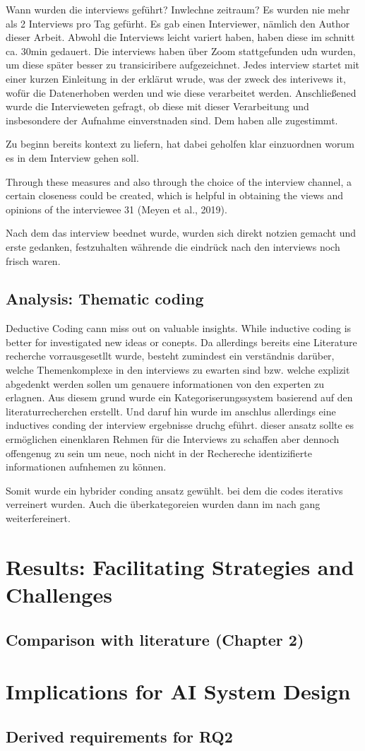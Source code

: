 Wann wurden die interviews geführt? Inwlechne zeitraum?
Es wurden nie mehr als 2 Interviews pro Tag gefürht. Es gab einen Interviewer, nämlich den Author dieser Arbeit.
Abwohl die Interviews leicht variert haben, haben diese im schnitt ca. 30min gedauert.
Die interviews haben über Zoom stattgefunden udn wurden, um diese später besser zu transiciribere aufgezeichnet.
Jedes interview startet mit einer kurzen Einleitung in der erklärut wrude, was der zweck des interivews it,
wofür die Datenerhoben werden und wie diese verarbeitet werden. Anschließened wurde die Intervieweten
gefragt, ob diese mit dieser Verarbeitung und insbesondere der Aufnahme einverstnaden sind.
Dem haben alle zugestimmt.

Zu beginn bereits kontext zu liefern, hat dabei geholfen klar einzuordnen worum es in dem Interview gehen soll.

Through
these measures and also through the choice of the interview channel, a certain closeness
could be created, which is helpful in obtaining the views and opinions of the interviewee
31
(Meyen et al., 2019).

Nach dem das interview beednet wurde, wurden sich direkt notzien gemacht und erste gedanken, festzuhalten
währende die eindrück nach den interviews noch frisch waren.
\subsection{Analysis: Thematic coding}

Deductive Coding cann miss out on valuable insights. While inductive coding is better for investigated new
ideas or conepts.
Da allerdings bereits eine Literature recherche vorrausgesetllt wurde, besteht zumindest ein verständnis
darüber, welche Themenkomplexe in den interviews zu ewarten sind bzw. welche explizit abgedenkt werden sollen
um genauere informationen von den experten zu erlagnen.
Aus diesem grund wurde ein Kategoriserungssystem basierend auf den literaturrecherchen erstellt.
Und daruf hin wurde im anschlus allerdings eine inductives conding der interview ergebnisse druchg eführt.
dieser ansatz sollte es ermöglichen einenklaren Rehmen für die Interviews zu schaffen aber dennoch offengenug
zu sein um neue, noch nicht in der Rechereche identizifierte informationen aufnhemen zu können.

Somit wurde ein hybrider conding ansatz gewühlt. bei dem die codes iterativs verreinert wurden. Auch die
überkategoreien wurden dann im nach gang weiterfereinert.

\section{Results: Facilitating Strategies and Challenges}
\subsection{Comparison with literature (Chapter 2)}
\section{Implications for AI System Design}
\subsection{Derived requirements for RQ2}